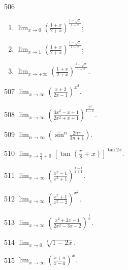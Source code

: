 \begin{prob}[L]{506}
\begin{enumerate}[label=(\alph*), itemsep=2pt, topsep=3pt]
  \item $\displaystyle \lim_{x\to 0} \left(\frac{1+x}{2+x}\right)^{\frac{1-\sqrt{x}}{1-x}}$;
  \item $\displaystyle \lim_{x\to 1} \left(\frac{1+x}{2+x}\right)^{\frac{1-\sqrt{x}}{1-x}}$;
  \item $\displaystyle \lim_{x\to +\infty} \left(\frac{1+x}{2+x}\right)^{\frac{1-\sqrt{x}}{1-x}}.$
\end{enumerate}
\end{prob}

\begin{prob}[S]{507}
$\displaystyle \lim_{x\to \infty} \left(\frac{x+2}{2x-1}\right)^{x^2}.$
\end{prob}

\begin{prob}[S]{508}
$\displaystyle \lim_{x\to \infty} \left(\frac{3x^2 - x + 1}{2x^2 + x + 1}\right)^{\frac{x^3}{1-x}}.$
\end{prob}

\begin{prob}[S]{509}
$\displaystyle \lim_{n\to \infty} \left(\sin^n \frac{2n\pi}{3n+1}\right).$
\end{prob}

\begin{prob}[S]{510}
$\displaystyle \lim_{x\to \frac{\pi}{4}+0} \left[\tan\left(\frac{\pi}{8}+x\right)\right]^{\tan 2x}.$
\end{prob}

\begin{prob}[S]{511}
$\displaystyle \lim_{x\to \infty} \left(\frac{x^2-1}{x^2+1}\right)^{\frac{x-1}{x+1}}.$
\end{prob}

\begin{prob}[S]{512}
$\displaystyle \lim_{x\to \infty} \left(\frac{x^2+1}{x^2-2}\right)^{x^2}.$
\end{prob}

\begin{prob}[S]{513}
$\displaystyle \lim_{x\to \infty} \left(\frac{x^2+2x-1}{2x^2-3x-2}\right)^{\frac{1}{x}}.$
\end{prob}

\begin{prob}[S]{514}
$\displaystyle \lim_{x\to 0} \sqrt[x]{1-2x}.$
\end{prob}

\begin{prob}[S]{515}
$\displaystyle \lim_{x\to \infty} \left(\frac{x+a}{x-a}\right)^x.$
\end{prob}

